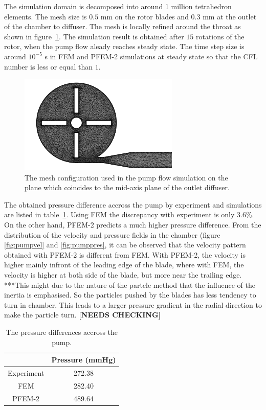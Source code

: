 The simulation domain is decomposed into around 1 million tetrahedron elements. The mesh size is $0.5$ mm on the rotor blades and $0.3$ mm at the outlet of the chamber to diffuser. The mesh is locally refined around the throat as shown in figure~\ref{fig:pumpmesh}. The simulation result is obtained after $15$ rotations of the rotor, when the pump flow aleady reaches steady state. The time step size is around $10^{-5}$ s in FEM and PFEM-2 simulations at steady state so that the CFL number is less or equal than $1$.  

\begin{figure}[htbp]
    \centering
    \includegraphics[width=3in]{imgs/nozzle_pump/pump_mesh.pdf}
    \caption{The mesh configuration used in the pump flow simulation on the plane which coincides to the mid-axis plane of the outlet diffuser.}
    \label{fig:pumpmesh}
\end{figure}


The obtained pressure difference accross the pump by experiment and simulations are listed in table~\ref{tab:pumppres}. Using FEM the discrepancy with experiment is only $3.6$\%. On the other hand, PFEM-2 predicts a much higher pressure difference. From the distribution of the velocity and pressure fields in the chamber (figure \ref{fig:pumpvel} and \ref{fig:pumppres}, it can be observed that the velocity pattern obtained with PFEM-2 is different from FEM. With PFEM-2, the velocity is higher mainly infront of the leading edge of the blade, where with FEM, the velocity is higher at both side of the blade, but more near the trailing edge. ***This might due to the nature of the partcle method that the influence of the inertia is emphasised. So the particles pushed by the blades has less tendency to turn in chamber. This leads to a larger pressure gradient in the radial direction to make the particle turn. \textbf{[NEEDS CHECKING]}

\begin{table}[h]
\caption {The pressure differences accross the pump.}\label{tab:pumppres} 
\centering
\begin{tabular}{|c|c|}
\hline
 & Pressure (mmHg) \\ \hline
Experiment \cite{mali_cfd}    & 272.38    \\ \hline
FEM    & 282.40             \\ \hline
PFEM-2    & 489.64          \\ \hline
\end{tabular}
\end{table}

